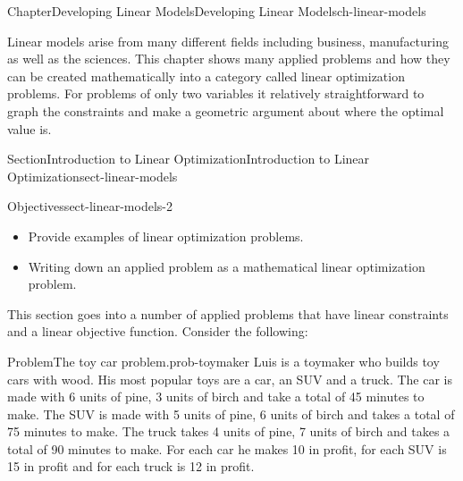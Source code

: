 \documentclass[oneside,10pt,]{book}
\numberwithin{equation}{section}
\begin{document}
%
%
\typeout{************************************************}
\typeout{************************************************}
%
\begin{chapterptx}{Chapter}{Developing Linear Models}{}{Developing Linear Models}{}{}{ch-linear-models}
\renewcommand*{\chaptername}{Chapter}
\begin{introduction}{}%
Linear models arise from many different fields including business, manufacturing as well as the sciences. This chapter shows many applied problems and how they can be created mathematically into a category called linear optimization problems. For problems of only two variables it relatively straightforward to graph the constraints and make a geometric argument about where the optimal value is.%
\end{introduction}%
%
%
\typeout{************************************************}
\typeout{************************************************}
%
\begin{sectionptx}{Section}{Introduction to Linear Optimization}{}{Introduction to Linear Optimization}{}{}{sect-linear-models}
\begin{objectives}{Objectives}{sect-linear-models-2}
%
\begin{itemize}[label=\textbullet]
\item{}Provide examples of linear optimization problems.%
\item{}Writing down an applied problem as a mathematical linear optimization problem.%
\end{itemize}
\end{objectives}
\begin{introduction}{}%
This section goes into a number of applied problems that have linear constraints and a linear objective function. Consider the following:%
\begin{problem}{Problem}{The toy car problem.}{prob-toymaker}%
Luis is a toymaker who builds toy cars with wood. His most popular toys are a car, an SUV and a truck. The car is made with 6 units of pine, 3 units of birch and take a total of 45 minutes to make. The SUV is made with 5 units of pine, 6 units of birch and takes a total of 75 minutes to make. The truck takes 4 units of pine, 7 units of birch and takes a total of 90 minutes to make. For each car he makes \textdollar{}10 in profit, for each SUV is \textdollar{}15 in profit and for each truck is \textdollar{}12 in profit.%
\par

\end{problem}
\end{introduction}
\end{sectionptx}
\end{chapterptx}
\end{document}

